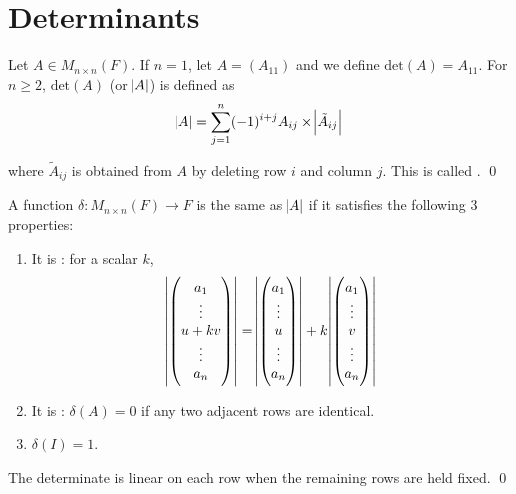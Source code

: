 \section{Determinants}

\begin{definition}
	Let $A \in M_{n \times n} (F)$. If $n =1$, let $A=(A_{11})$ and we define $\text{det}(A) = A_{11}$. For $n \geq 2$, $\text{det}(A)$ (or $\abs{A}$) is defined as
	\begin{equation}
		\abs{A} = \sum_{j=1}^n (-1)^{i + j} A_{ij} \times \abs{\tilde{A}_{ij}}
	\end{equation}
	
	where $\tilde{A}_{ij}$ is obtained from $A$ by deleting row $i$ and column $j$. This is called .
	\qed
\end{definition}


\begin{theorem}
    A function $\delta: M_{n \times n} (F) \rightarrow F$ is the same as $\abs{A}$ if it satisfies the following 3 properties:
    \begin{enumerate}
        \item It is : for a scalar $k$, \begin{equation}
        \abs{\begin{pmatrix}
            a_1\\
            \vdots\\
            u + kv \\
            \vdots\\
            a_n
        \end{pmatrix}} = \abs{\begin{pmatrix}
            a_1\\
            \vdots\\
            u \\
            \vdots\\
            a_n
        \end{pmatrix}} + k \abs{\begin{pmatrix}
            a_1\\
            \vdots\\
            v \\
            \vdots\\
            a_n
        \end{pmatrix}}
    \end{equation}
    \item It is : $\delta(A) = 0$ if any two adjacent rows are identical.
    \item $\delta(I) = 1$.
    \end{enumerate}
    The determinate is linear on each row when the remaining rows are held fixed.
    \qed
\end{theorem}



